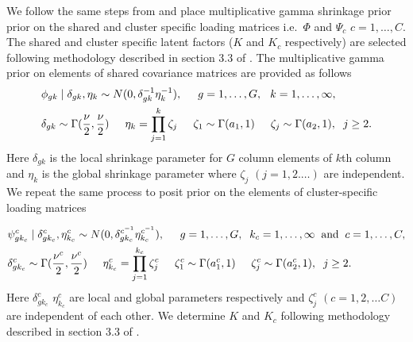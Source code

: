 \documentclass[
]{book}
\begin{document}
We follow the same steps from \citet{de2018bayesian} and place multiplicative gamma shrinkage prior \citep{bhattacharya2011sparse} prior on the shared and cluster specific loading matrices i.e.~\(\Phi\) and \(\Psi_{c}\) \(c=1,\dots,C\). The shared and cluster specific latent factors (\(K\) and \(K_{c}\) respectively) are selected following methodology described in section 3.3 of \citet{de2018bayesian}. The multiplicative gamma prior on elements of shared covariance matrices are provided as follows
\begin{equation}
\begin{split}
& \phi_{gk} \mid \delta_{gk}, \eta_{k} \sim N(0, \delta_{gk}^{-1} \eta_{k}^{-1}), \hspace{0.5cm} g = 1, \dots , G, \hspace{0.25cm} k = 1, \dots, \infty, \\
& \delta_{gk} \sim \Gamma(\frac{\nu}{2}, \frac{\nu}{2}) \hspace{0.5cm}  \eta_{k} = \prod_{j=1}^{k} \zeta_{j} \hspace{0.5cm} \zeta_{1} \sim \Gamma(a_{1},1) \hspace{0.5cm}  \zeta_{j} \sim \Gamma(a_{2},1), \hspace{0.2cm} j \ge 2. 
\end{split}
\end{equation}
Here \(\delta_{gk}\) is the local shrinkage parameter for \(G\) column elements of \(k\)th column and \(\eta_{k}\) is the global shrinkage parameter where \(\zeta_{j}\) \((j=1,2. \dots)\) are independent. We repeat the same process to posit prior on the elements of cluster-specific loading matrices

\begin{equation}
\begin{split}
& \psi^{c}_{gk_{c}} \mid \delta^{c}_{gk_{c}}, \eta^{c}_{k_{c}} \sim N(0, {\delta^{c^{-1}}_{gk_{c}}} {\eta^{c^{-1}}_{k_{c}}}), \hspace{0.5cm} g = 1, \dots , G, \hspace{0.2cm} k_{c} = 1, \dots, \infty \hspace{0.2cm} \text{and} \hspace{0.2cm} c = 1, \dots , C,\\
& \delta^{c}_{gk_{c}} \sim \Gamma(\frac{\nu^{c}}{2}, \frac{\nu^{c}}{2}) \hspace{0.5cm}  \eta^{c}_{k_{c}} = \prod_{j=1}^{k_{c}} \zeta^{c}_{j} \hspace{0.5cm} \zeta^{c}_{1} \sim \Gamma(a^{c}_{1},1) \hspace{0.5cm}  \zeta^{c}_{j} \sim \Gamma(a^{c}_{2},1), \hspace{0.2cm} j \ge 2.
\end{split}
\end{equation}
Here \(\delta^{c}_{gk_{c}}\) \(\eta^{c}_{k_{c}}\) are local and global parameters respectively and \(\zeta_{j}^{c}\) \((c=1,2, \dots C)\) are independent of each other. We determine \(K\) and \(K_{c}\) following methodology described in section 3.3 of \citet{de2018bayesian}.
\end{document}
